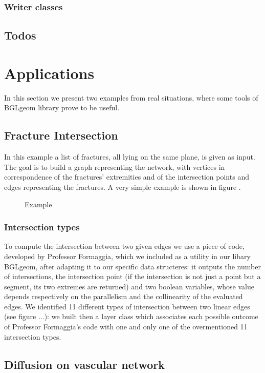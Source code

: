 \documentclass[11pt]{article} %
\begin{document}
		\subsubsection{Writer classes}

	
	
	
	
	\subsection{Todos}	%


\section{Applications}

	In this section we present two examples from real situations, where some tools of BGLgeom library prove to be useful.

	\subsection{Fracture Intersection}
	In this example a list of fractures, all lying on the same plane, is given as input. The goal is to build a graph representing the network, with vertices in correspondence of the fractures' extremities and of the intersection points  and edges representing the fractures. A very simple example is shown in figure \label{fig:frac_int}.
	\begin{figure}
		\centering 
		\caption{Example}
		\label{fig:frac_int}
	\end{figure}
	
		\subsubsection{Intersection types}
		To compute the intersection between two given edges we use a piece of code, developed by Professor Formaggia, which we included as a utility in our libary BGLgeom, after adapting it to our specific data structeres: it outputs the number of intersections, the intersection point (if the intersection is not just a point but a segment, its two extremes are returned) and two boolean variables, whose value depends respectively on the parallelism and the collinearity of the evaluated edges. \newline
		We identified 11 different types of intersection between two linear edges (see figure ...): we built then a layer class which associates each possible outcome of Professor Formaggia's code with one and only one of the overmentioned 11 intersection types. \newline
			
		



	\subsection{Diffusion on vascular network}

\end{document}

